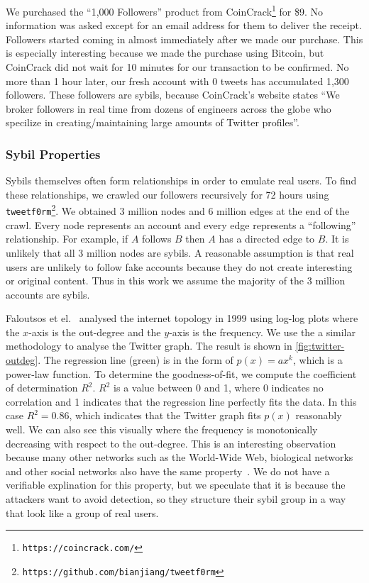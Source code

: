 We purchased the ``1,000 Followers'' product from
CoinCrack\footnote{\texttt{https://coincrack.com/}} for \$9. No information was
asked except for an email address for them to deliver the receipt. Followers
started coming in almost immediately after we made our purchase. This is
especially interesting because we made the purchase using Bitcoin, but CoinCrack
did not wait for 10 minutes for our transaction to be confirmed. No more than 1
hour later, our fresh account with 0 tweets has accumulated 1,300 followers.
These followers are sybils, because CoinCrack's website states ``We broker
followers in real time from dozens of engineers across the globe who specilize
in creating/maintaining large amounts of Twitter profiles''.

\subsubsection{Sybil Properties}
Sybils themselves often form relationships in order to emulate real users. To
find these relationships, we crawled our followers recursively for 72 hours
using
\verb!tweetf0rm!\footnote{\texttt{https://github.com/bianjiang/tweetf0rm}}. We
obtained 3 million nodes and 6 million edges at the end of the crawl. Every node
represents an account and every edge represents a ``following'' relationship.
For example, if $A$ follows $B$ then $A$ has a directed edge to $B$. It is
unlikely that all 3 million nodes are sybils. A reasonable assumption is that
real users are unlikely to follow fake accounts because they do not create
interesting or original content. Thus in this work we assume the majority of the
3 million accounts are sybils.

Faloutsos et el.~\cite{faloutsos1999power} analysed the internet topology in
1999 using log-log plots where the $x$-axis is the out-degree and the $y$-axis
is the frequency. We use the a similar methodology to analyse the Twitter graph.
The result is shown in \autoref{fig:twitter-outdeg}. The regression line (green)
is in the form of $p(x) = ax^k$, which is a power-law function. To determine the
goodness-of-fit, we compute the coefficient of determination $R^2$. $R^2$ is a
value between 0 and 1, where 0 indicates no correlation and 1 indicates that the
regression line perfectly fits the data. In this case $R^2 = 0.86$, which
indicates that the Twitter graph fits $p(x)$ reasonably well. We can also see
this visually where the frequency is monotonically decreasing with respect to
the out-degree. This is an interesting observation because many other networks
such as the World-Wide Web, biological networks and other social networks also
have the same property~\cite{faloutsos1999power, girvan2002community}. We do not
have a verifiable explination for this property, but we speculate that it is
because the attackers want to avoid detection, so they structure their sybil
group in a way that look like a group of real users.


